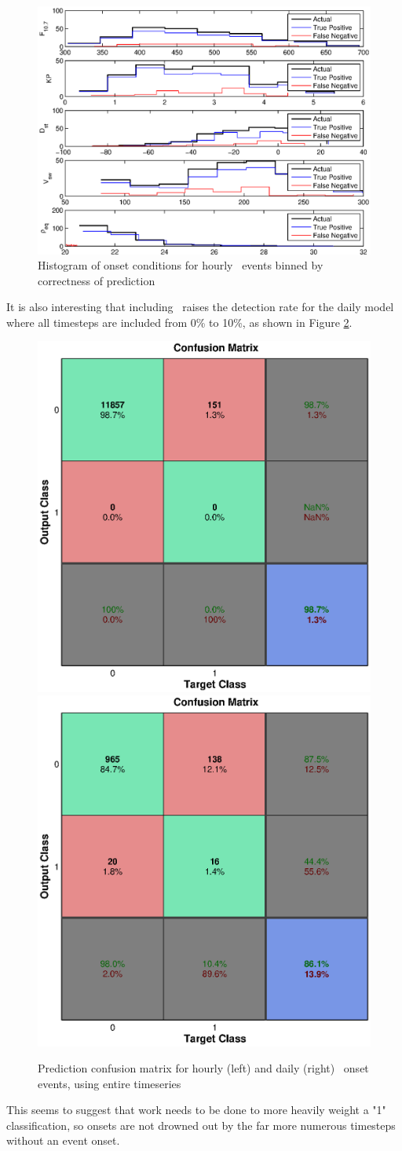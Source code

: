 \begin{figure}[htp!]
	\centering
	\includegraphics[width=1\linewidth]{Figures/CH5/NNBinaryOnset-hourly-withreq-hist.eps}
	\caption{Histogram of onset conditions for hourly \req\ events binned by correctness of prediction}
	\label{fig:OnsetWithreq-hist}
\end{figure}

It is also interesting that including \req\ raises the detection rate for the daily model where all timesteps are included from 0\% to 10\%, as shown in Figure \ref{fig:OnsetFullWithreq}.

\begin{figure}[htp!]
	\centering
	\includegraphics[width=0.45\linewidth]{Figures/CH5/NNBinaryOnset-full-hourly-withreq.eps}
	\includegraphics[width=0.45\linewidth]{Figures/CH5/NNBinaryOnset-full-daily-withreq.eps}
	\caption{Prediction confusion matrix for hourly (left) and daily (right) \req\ onset events, using entire timeseries}
	\label{fig:OnsetFullWithreq}
\end{figure}

This seems to suggest that work needs to be done to more heavily weight a "1" classification, so onsets are not drowned out by the far more numerous timesteps without an event onset.